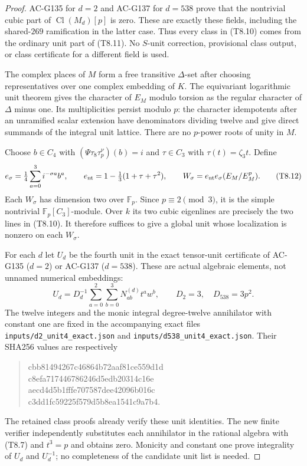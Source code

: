 \begin{proof}
AC-G135 for $d=2$ and AC-G137 for $d=538$ prove that the
nontrivial cubic part of $\operatorname{Cl}(M_d)[p]$ is zero.
These are exactly these fields, including the shared-$269$ ramification
in the latter case.  Thus every class in (T8.10) comes from the
ordinary unit part of (T8.11).  No $S$-unit correction, provisional
class output, or class certificate for a different field is used.

The complex places of $M$ form a free transitive $\Delta$-set after
choosing representatives over one complex embedding of $K$.
The equivariant logarithmic unit theorem gives the character of
$E_M$ modulo torsion as the regular character of $\Delta$ minus one.
Its multiplicities persist modulo $p$: the character idempotents
after an unramified scalar extension have denominators dividing
twelve and give direct summands of the integral unit lattice.
There are no $p$-power roots of unity in $M$.

Choose $b\in C_4$ with $(\Psi\tau_8\tau_p^\nu)(b)=i$ and
$\tau\in C_3$ with $\tau(t)=\zeta_3t$.  Define
\[
 e_\sigma=\tfrac14\sum_{a=0}^3i^{-\sigma a}b^a,\qquad
 e_{\rm nt}=1-\tfrac13(1+\tau+\tau^2),\qquad
 W_\sigma=e_{\rm nt}e_\sigma(E_M/E_M^p).
 \tag{T8.12}
\]
Each $W_\sigma$ has dimension two over $\mathbb F_p$.
Since $p\equiv2\pmod3$, it is the simple nontrivial
$\mathbb F_p[C_3]$-module.  Over $k$ its two cubic eigenlines
are precisely the two lines in (T8.10).
It therefore suffices to give a global unit whose localization
is nonzero on each $W_\sigma$.

For each $d$ let $U_d$ be the fourth unit in the exact tensor-unit
certificate of AC-G135 ($d=2$) or AC-G137 ($d=538$).
These are actual algebraic elements, not unnamed numerical embeddings:
\[
 U_d=D_d^{-1}\sum_{a=0}^2\sum_{b=0}^3N^{(d)}_{ab}t^aw^b,
 \qquad D_2=3,\quad D_{538}=3p^2.
 \tag{T8.13}
\]
The twelve integers and the monic integral degree-twelve annihilator
with constant one are fixed in the accompanying exact files
\texttt{inputs/d2\_unit4\_exact.json} and
\texttt{inputs/d538\_unit4\_exact.json}.
Their SHA256 values are respectively
\begin{quote}\small\ttfamily
cbb81494267c46864b72aaf81ce559d1d\\
c8efa717446786246d5edb20314c16e\\[2pt]
aecd4d5b1fffe707587dee42096b016c\\
c3dd1fc59225f579d5b8ea1541c9a7b4.
\end{quote}
The retained class proofs already verify these unit identities.
The new finite verifier independently substitutes each annihilator
in the rational algebra with (T8.7) and $t^3=p$ and obtains zero.
Monicity and constant one prove integrality of $U_d$ and $U_d^{-1}$;
no completeness of the candidate unit list is needed.


\end{proof}
